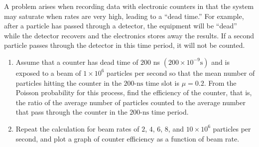 \item[2.15] A problem arises when recording data with electronic counters in
  that the system may saturate when rates are very high, leading to a ``dead
  time.'' For example, after a particle has passed through a detector, the
  equipment will be ``dead'' while the detector recovers and the electronics
  stores away the results. If a second particle passes through the detector in
  this time period, it will not be counted.
\begin{enumerate}[label=\alph*]
  \item Assume that a counter has dead time of $200$ ns $(200 \times
    10^{-9} \text{s})$ and is exposed to a beam of $1 \times 10^6$ particles per
    second so that the mean number of particles hitting the counter in the
    $200\text{-ns}$ time slot is $\mu = 0.2$. From the Poisson probability for
    this process, find the efficiency of the counter, that is, the ratio of the
    average number of particles counted to the average number that pass through
    the counter in the $200\text{-ns}$ time period.
  \item Repeat the calculation for beam rates of $2$, $4$, $6$, $8$, and
    $10 \times 10^6$ particles per second, and plot a graph of counter
    efficiency as a function of beam rate.
\end{enumerate}